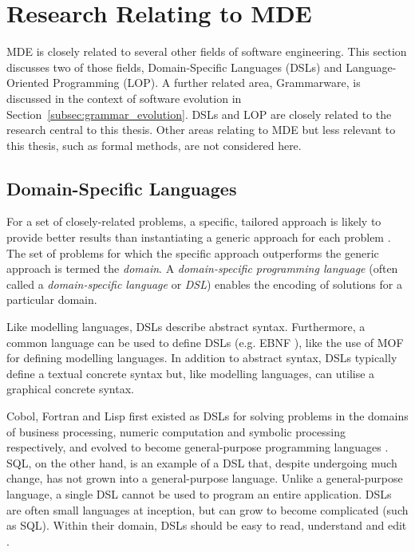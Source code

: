 
\section{Research Relating to MDE}
\label{sec:mde_related}
MDE is closely related to several other fields of software engineering. This section discusses two of those fields, Domain-Specific Languages (DSLs) and Language-Oriented Programming (LOP). A further related area, Grammarware, is discussed in the context of software evolution in Section~\ref{subsec:grammar_evolution}. DSLs and LOP are closely related to the research central to this thesis. Other areas relating to MDE but less relevant to this thesis, such as formal methods, are not considered here.

\subsection{Domain-Specific Languages}
\label{subsec:dsls}
For a set of closely-related problems, a specific, tailored approach is likely to provide better results than instantiating a generic approach for each problem \cite{deursen00dslbib}. The set of problems for which the specific approach outperforms the generic approach is termed the \emph{domain}. A \emph{domain-specific programming language} (often called a \emph{domain-specific language} or \emph{DSL}) enables the encoding of solutions for a particular domain.

Like modelling languages, DSLs describe abstract syntax. Furthermore, a common language can be used to define DSLs (e.g. EBNF \cite{ebnf}), like the use of MOF for defining modelling languages. In addition to abstract syntax, DSLs typically define a textual concrete syntax but, like modelling languages, can utilise a graphical concrete syntax.

Cobol, Fortran and Lisp first existed as DSLs for solving problems in the domains of business processing, numeric computation and symbolic processing respectively, and evolved to become general-purpose programming languages \cite{deursen00dslbib}. SQL, on the other hand, is an example of a DSL that, despite undergoing much change, has not grown into a general-purpose language. Unlike a general-purpose language, a single DSL cannot be used to program an entire application. DSLs are often small languages at inception, but can grow to become complicated (such as SQL). Within their domain, DSLs should be easy to read, understand and edit \cite{fowler10dsls}.

